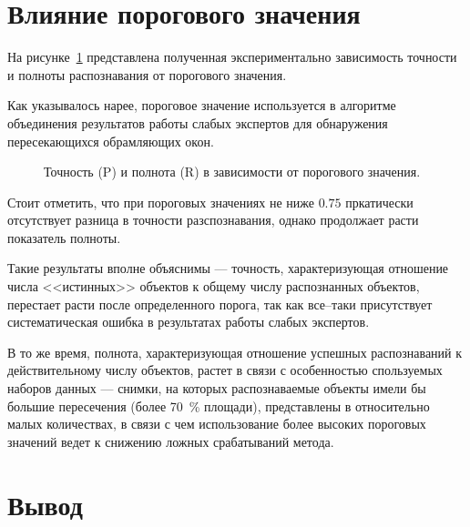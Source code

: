 \section{Влияние порогового значения}

На рисунке~\ref{plt:limit-impact} представлена полученная экспериментально зависимость точности и полноты распознавания от порогового значения.

Как указывалось нарее, пороговое значение используется в алгоритме объединения результатов работы слабых экспертов для обнаружения пересекающихся обрамляющих окон.

\begin{figure}[htp]
	\centering
	\captionsetup{justification=centering}
		\caption{Точность (P) и полнота (R) в зависимости от порогового значения.}
	\label{plt:limit-impact}
\end{figure}

Стоит отметить, что при пороговых значениях не ниже $0.75$ пркатически отсутствует разница в точности разспознавания, однако продолжает расти показатель полноты. 

Такие результаты вполне объяснимы --- точность, характеризующая отношение числа <<истинных>> объектов к общему числу распознанных объектов, перестает расти после определенного порога, так как все--таки присутствует систематическая ошибка в результатах работы слабых экспертов. 

В то же время, полнота, характеризующая отношение успешных распознаваний к действительному числу объектов, растет в связи с особенностью спользуемых наборов данных --- снимки, на которых распознаваемые объекты имели бы большие пересечения (более 70~\% площади), представлены в относительно малых количествах, в связи с чем использование более высоких пороговых значений ведет к снижению ложных срабатываний метода.

\section{Вывод}


